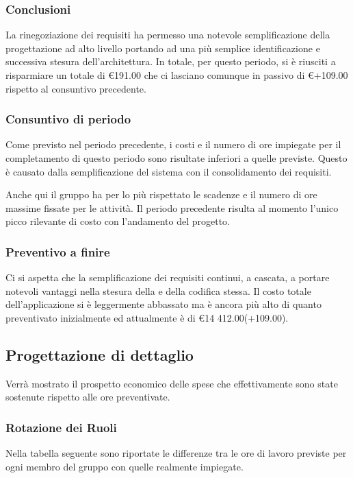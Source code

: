 \documentclass[12pt,a4paper]{article}
\begin{document}
\subsubsection{Conclusioni}
La rinegoziazione dei requisiti ha permesso una notevole semplificazione della progettazione ad alto livello portando ad una più semplice identificazione e successiva stesura dell'architettura. In totale, per questo periodo, si è riusciti a risparmiare un totale di \euro{}191.00 che ci lasciano comunque in passivo di \euro{}+109.00 rispetto al consuntivo precedente.

\subsubsection{Consuntivo di periodo}

\par Come previsto nel periodo precedente, i costi e il numero di ore impiegate per il completamento di questo periodo sono risultate inferiori a quelle previste. Questo è causato dalla semplificazione del sistema con il consolidamento dei requisiti. \\

\par Anche qui il gruppo ha per lo più rispettato le scadenze e il numero di ore massime fissate per le attività. Il periodo precedente risulta al momento l'unico picco rilevante di costo con l'andamento del progetto. \\

\subsubsection{Preventivo a finire}
Ci si aspetta che la semplificazione dei requisiti continui, a cascata, a portare notevoli vantaggi nella stesura della \DP{} e della codifica stessa. Il costo totale dell'applicazione si è leggermente abbassato ma è ancora più alto di quanto preventivato inizialmente ed attualmente è di \euro{}14 412.00(+109.00).

\newpage

\subsection{Progettazione di dettaglio}
Verrà mostrato il prospetto economico delle spese che effettivamente sono state sostenute rispetto alle ore preventivate.

\subsubsection{Rotazione dei Ruoli}
Nella tabella seguente sono riportate le differenze tra le ore di lavoro previste per ogni membro del gruppo con quelle realmente impiegate.
\end{document}
